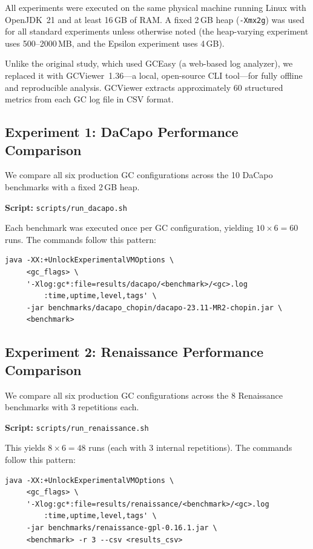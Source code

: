 All experiments were executed on the same physical machine running Linux with OpenJDK~21 and at least 16\,GB of RAM. A fixed 2\,GB heap (\texttt{-Xmx2g}) was used for all standard experiments unless otherwise noted (the heap-varying experiment uses 500--2000\,MB, and the Epsilon experiment uses 4\,GB).

Unlike the original study, which used GCEasy (a web-based log analyzer), we replaced it with GCViewer~1.36---a local, open-source CLI tool---for fully offline and reproducible analysis. GCViewer extracts approximately 60 structured metrics from each GC log file in CSV format.

\subsection{Experiment 1: DaCapo Performance Comparison}
We compare all six production GC configurations across the 10 DaCapo benchmarks with a fixed 2\,GB heap.

\textbf{Script:} \texttt{scripts/run\_dacapo.sh}

Each benchmark was executed once per GC configuration, yielding $10 \times 6 = 60$ runs. The commands follow this pattern:

\begin{verbatim}
java -XX:+UnlockExperimentalVMOptions \
     <gc_flags> \
     '-Xlog:gc*:file=results/dacapo/<benchmark>/<gc>.log
         :time,uptime,level,tags' \
     -jar benchmarks/dacapo_chopin/dacapo-23.11-MR2-chopin.jar \
     <benchmark>
\end{verbatim}

\subsection{Experiment 2: Renaissance Performance Comparison}

We compare all six production GC configurations across the 8 Renaissance benchmarks with 3 repetitions each.

\textbf{Script:} \texttt{scripts/run\_renaissance.sh}

This yields $8 \times 6 = 48$ runs (each with 3 internal repetitions). The commands follow this pattern:

\begin{verbatim}
java -XX:+UnlockExperimentalVMOptions \
     <gc_flags> \
     '-Xlog:gc*:file=results/renaissance/<benchmark>/<gc>.log
         :time,uptime,level,tags' \
     -jar benchmarks/renaissance-gpl-0.16.1.jar \
     <benchmark> -r 3 --csv <results_csv>
\end{verbatim}

